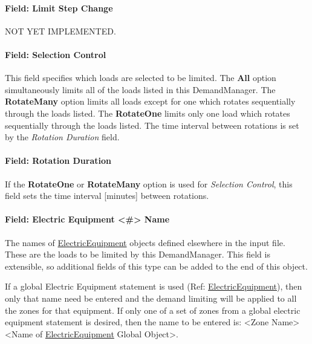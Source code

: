 \paragraph{Field: Limit Step Change}\label{field-limit-step-change-2}

NOT YET IMPLEMENTED.

\paragraph{Field: Selection Control}\label{field-selection-control-2}

This field specifies which loads are selected to be limited. The \textbf{All} option simultaneously limits all of the loads listed in this DemandManager. The \textbf{RotateMany} option limits all loads except for one which rotates sequentially through the loads listed. The \textbf{RotateOne} limits only one load which rotates sequentially through the loads listed. The time interval between rotations is set by the \emph{Rotation Duration} field.

\paragraph{Field: Rotation Duration}\label{field-rotation-duration-2}

If the \textbf{RotateOne} or \textbf{RotateMany} option is used for \emph{Selection Control}, this field sets the time interval {[}minutes{]} between rotations.

\paragraph{Field: Electric Equipment \textless{}\#\textgreater{} Name}\label{field-electric-equipment-1-10-name}

The names of \hyperref[electricequipment]{ElectricEquipment} objects defined elsewhere in the input file. These are the loads to be limited by this DemandManager.  This field is extensible, so additional fields of this type can be added to the end of this object.

If a global Electric Equipment statement is used (Ref: \hyperref[electricequipment]{ElectricEquipment}), then only that name need be entered and the demand limiting will be applied to all the zones for that equipment. If only one of a set of zones from a global electric equipment statement is desired, then the name to be entered is: \textless{}Zone Name\textgreater{} \textless{}Name of \hyperref[electricequipment]{ElectricEquipment} Global Object\textgreater{}.

